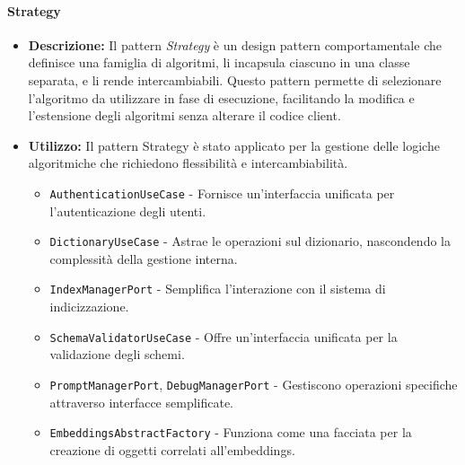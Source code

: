 \paragraph{Strategy}
\begin{itemize}
    \item{\textbf{Descrizione:}} Il pattern \textit{Strategy} è un design pattern comportamentale che definisce una famiglia di algoritmi, li incapsula ciascuno in una classe separata, e li rende intercambiabili. Questo pattern permette di selezionare l'algoritmo da utilizzare in fase di esecuzione, facilitando la modifica e l'estensione degli algoritmi senza alterare il codice client.
    \item{\textbf{Utilizzo:}} Il pattern Strategy è stato applicato per la gestione delle logiche algoritmiche che richiedono flessibilità e intercambiabilità.
    \begin{itemize}
        \item \texttt{AuthenticationUseCase} - Fornisce un'interfaccia unificata per l'autenticazione degli utenti.
        \item \texttt{DictionaryUseCase} - Astrae le operazioni sul dizionario, nascondendo la complessità della gestione interna.
        \item \texttt{IndexManagerPort} - Semplifica l'interazione con il sistema di indicizzazione.
        \item \texttt{SchemaValidatorUseCase} - Offre un'interfaccia unificata per la validazione degli schemi.
        \item \texttt{PromptManagerPort}, \texttt{DebugManagerPort} - Gestiscono operazioni specifiche attraverso interfacce semplificate.
        \item \texttt{EmbeddingsAbstractFactory} - Funziona come una facciata per la creazione di oggetti correlati all'embeddings.
    \end{itemize}
\end{itemize}

